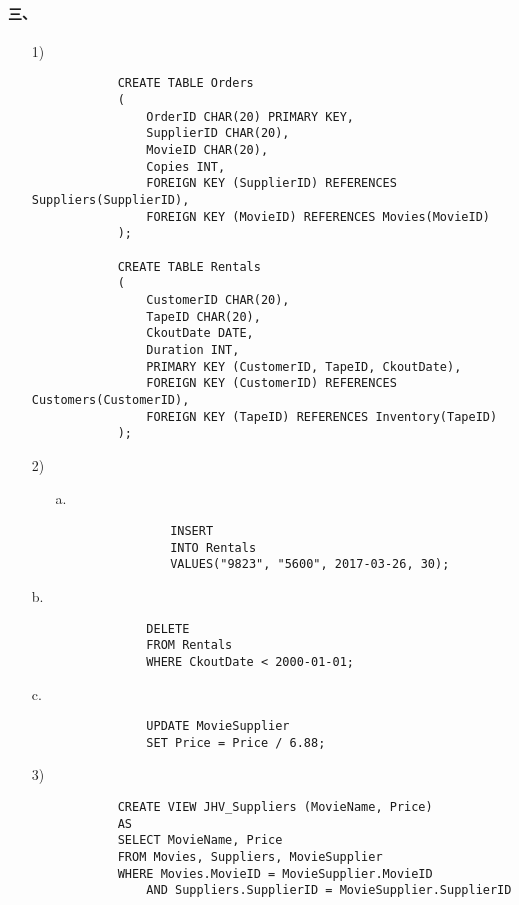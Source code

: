 \documentclass[10pt,a4paper]{article}
\begin{document}
    \paragraph{三、}
    \begin{enumerate}
        \item[1)]\begin{verbatim}
            CREATE TABLE Orders
            (
                OrderID CHAR(20) PRIMARY KEY,
                SupplierID CHAR(20), 
                MovieID CHAR(20),
                Copies INT,
                FOREIGN KEY (SupplierID) REFERENCES Suppliers(SupplierID),
                FOREIGN KEY (MovieID) REFERENCES Movies(MovieID)
            );

            CREATE TABLE Rentals
            (
                CustomerID CHAR(20),
                TapeID CHAR(20),
                CkoutDate DATE,
                Duration INT,
                PRIMARY KEY (CustomerID, TapeID, CkoutDate),
                FOREIGN KEY (CustomerID) REFERENCES Customers(CustomerID),
                FOREIGN KEY (TapeID) REFERENCES Inventory(TapeID)
            );
        \end{verbatim}
        \item[2)]\begin{enumerate}
            \item[a.]\begin{verbatim}
                INSERT
                INTO Rentals
                VALUES("9823", "5600", 2017-03-26, 30);
            \end{verbatim}
        \end{enumerate}
            \item[b.]\begin{verbatim}
                DELETE
                FROM Rentals
                WHERE CkoutDate < 2000-01-01;
            \end{verbatim}
            \item[c.]\begin{verbatim}
                UPDATE MovieSupplier
                SET Price = Price / 6.88;
            \end{verbatim}
        \item[3)]\begin{verbatim}
            CREATE VIEW JHV_Suppliers (MovieName, Price)
            AS
            SELECT MovieName, Price
            FROM Movies, Suppliers, MovieSupplier
            WHERE Movies.MovieID = MovieSupplier.MovieID
                AND Suppliers.SupplierID = MovieSupplier.SupplierID

\end{verbatim}
\end{enumerate}
\end{document}

